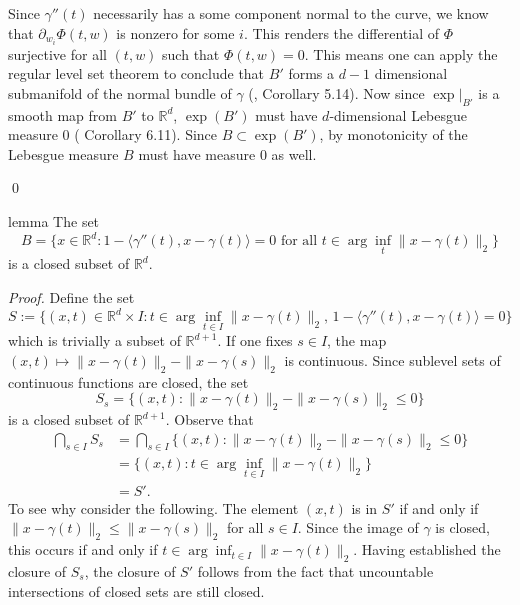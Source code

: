 \documentclass[11pt]{article}
\begin{document}
Since $\gamma''(t)$ necessarily has a some component normal to the curve, we know that $\partial_{w_i}\Phi(t,w)$ is nonzero for some $i$. This renders the differential of $\Phi$ surjective for all $(t,w)$ such that $\Phi(t,w) = 0$. This means one can apply the regular level set theorem to conclude that $B'$ forms a $d-1$ dimensional submanifold of the normal bundle of $\gamma$ (\citet{lee2003smooth}, Corollary 5.14). Now since $\exp\big|_{B'}$ is a smooth map from $B'$ to $\mathbb{R}^d$, $\exp(B')$ must have $d$-dimensional Lebesgue measure $0$ (\citet{lee2003smooth} Corollary 6.11). Since $B \subset \exp(B')$, by monotonicity of the Lebesgue measure $B$ must have measure $0$ as well.

\qed{}


\begin{restatable}{lemma}{} \label{lemma: IFT degen closed}
    The set 
    \begin{equation}
    B = \{x \in \mathbb{R}^d : 1 - \langle\gamma''(t), x-\gamma(t)\rangle = 0 \text{ for all }t \in \arg\inf_t\|x-\gamma(t)\|_2\}
    \end{equation}
    is a closed subset of $\mathbb{R}^d$. 
\end{restatable}

\noindent \textit{Proof.} Define the set
\begin{equation}
S:= \{(x,t) \in \mathbb{R}^d\times I : t \in \arg\inf_{t\in I}\|x-\gamma(t)\|_2, \, 1 - \langle\gamma''(t), x - \gamma(t)\rangle = 0\} \label{eq: S}
\end{equation}
which is trivially a subset of $\mathbb{R}^{d+1}$. If one fixes $s \in I$, the map $(x,t) \mapsto \|x-\gamma(t)\|_2 - \|x-\gamma(s)\|_2$ is continuous. Since sublevel sets of continuous functions are closed, the set
\begin{equation}
S_s = \{(x,t) : \|x-\gamma(t)\|_2 - \|x-\gamma(s)\|_2 \leq 0\}
\end{equation}
is a closed subset of $\mathbb{R}^{d+1}$. Observe that
\begin{align*}
    \bigcap_{s \in I} S_s &= \bigcap_{s \in I} \Big\{(x,t) : \|x-\gamma(t)\|_2 - \|x-\gamma(s)\|_2 \leq 0\Big \} \\
    &= \Big\{(x,t) : t\in \arg\inf_{t\in I}\|x-\gamma(t)\|_2 \Big \} \\
    &= S'.
\end{align*}
To see why consider the following. The element $(x,t)$ is in $S'$ if and only if $\|x - \gamma(t)\|_2  \leq \|x - \gamma(s)\|_2$ for all $s \in I$. Since the image of $\gamma$ is closed, this occurs if and only if $t \in \arg\inf_{t \in I} \|x - \gamma(t)\|_2$. Having established the closure of $S_s$, the closure of $S'$ follows from the fact that uncountable intersections of closed sets are still closed. 
\end{document}
